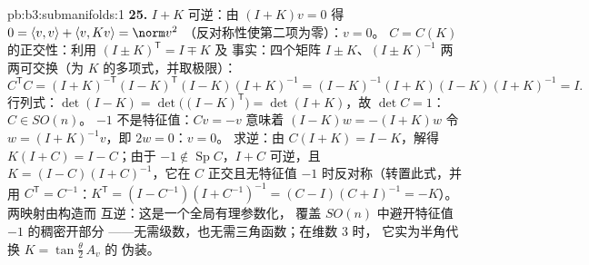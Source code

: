 \begin{solution}{pb:b3:submanifolds:1}
\textbf{25.} $I + K$ 可逆：由 $(I + K)v = 0$ 得 $0 =
\langle v, v\rangle + \langle v, Kv\rangle = \norm v^2$
（反对称性使第二项为零）：$v = 0$。
$C = C(K)$ 的正交性：利用 $(I \pm K)^{\mathsf T} = I \mp K$ 及
事实：四个矩阵 $I \pm K$、$(I \pm K)^{-1}$
两两可交换（为 $K$ 的多项式，并取极限）：
\[
C^{\mathsf T}C = (I + K)^{-\mathsf T}(I - K)^{\mathsf T}
(I - K)(I + K)^{-1}
= (I - K)^{-1}(I + K)(I - K)(I + K)^{-1} = I .
\]
行列式：$\det(I - K) = \det\bigl((I - K)^{\mathsf
T}\bigr) = \det(I + K)$，故 $\det C = 1$：$C \in SO(n)$。
$-1$ 不是特征值：$Cv = -v$ 意味着 $(I - K)w = -(I + K)w$
令 $w = (I + K)^{-1}v$，即 $2w = 0$：$v = 0$。
求逆：由 $C(I + K) = I - K$，解得 $K(I + C) = I -
C$；由于 $-1 \notin \operatorname{Sp}C$，$I + C$
可逆，且 $K = (I - C)(I + C)^{-1}$，它在
$C$ 正交且无特征值
$-1$ 时反对称（转置此式，并用 $C^{\mathsf T} =
C^{-1}$：$K^{\mathsf T} = (I - C^{-1})(I + C^{-1})^{-1} =
(C - I)(C + I)^{-1} = -K$）。两映射由构造而
互逆：这是一个全局有理参数化，
覆盖 $SO(n)$ 中避开特征值 $-1$ 的稠密开部分
——无需级数，也无需三角函数；在维数 $3$ 时，
它实为半角代换 $K = \tan\frac\theta2\,A_v$ 的
伪装。
\end{solution}
